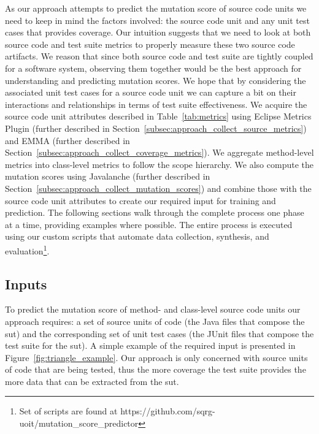 As our approach attempts to predict the mutation score of source code units we need to keep in mind the factors involved: the source code unit and any unit test cases that provides coverage. Our intuition suggests that we need to look at both source code and test suite metrics to properly measure these two source code artifacts. We reason that since both source code and test suite are tightly coupled for a software system, observing them together would be the best approach for understanding and predicting mutation scores. We hope that by considering the associated unit test cases for a source code unit we can capture a bit on their interactions and relationships in terms of test suite effectiveness. We acquire the source code unit attributes described in Table~\ref{tab:metrics} using Eclipse Metrics Plugin (further described in Section~\ref{subsec:approach_collect_source_metrics}) and EMMA (further described in Section~\ref{subsec:approach_collect_coverage_metrics}). We aggregate method-level metrics into class-level metrics to follow the scope hierarchy. We also compute the mutation scores using Javalanche (further described in Section~\ref{subsec:approach_collect_mutation_scores}) and combine those with the source code unit attributes to create our required input for training and prediction. The following sections walk through the complete process one phase at a time, providing examples where possible. The entire process is executed using our custom scripts that automate data collection, synthesis, and evaluation\footnote{Set of scripts are found at https://github.com/sqrg-uoit/mutation\_score\_predictor}.


\subsection{Inputs}
\label{subsec:approach_inputs}
To predict the mutation score of method- and class-level source code units our approach requires: a set of source units of code (the Java files that compose the \gls{sut}) and the corresponding set of unit test cases (the JUnit files that compose the test suite for the \gls{sut}). A simple example of the required input is presented in Figure~\ref{fig:triangle_example}. Our approach is only concerned with source units of code that are being tested, thus the more coverage the test suite provides the more data that can be extracted from the \gls{sut}.

